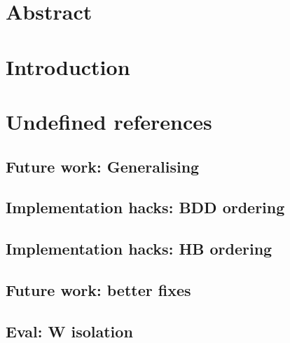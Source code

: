 \documentclass[12pt,a4paper]{report}
\begin{document}


\maketitle
\tableofcontents

\chapter{Abstract}


\chapter{Introduction}
















\chapter{Undefined references}
\section{Future work: Generalising}
\label{sect:future_work:generalising}

\section{Implementation hacks: BDD ordering}
\label{sect:implementation_hacks:bdd_ordering}

\section{Implementation hacks: HB ordering}
\label{sect:implementation_hacks:hb_ordering}

\section{Future work: better fixes}
\label{sect:future_work:better_fixes}

\section{Eval: W isolation}
\label{sect:eval:w_isolation}

\printglossaries



\end{document}
